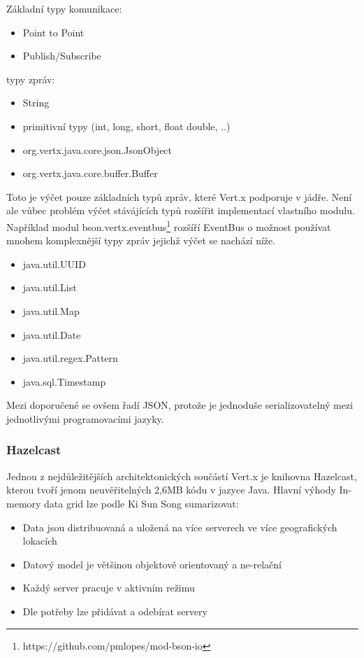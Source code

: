 Základní typy komunikace:
\begin{itemize}
\item{Point to Point}
\item{Publish/Subscribe}
\end{itemize}

typy zpráv:
\begin{itemize}
\item{String}
\item{primitivní typy (int, long, short, float double, ..)}
\item{org.vertx.java.core.json.JsonObject}
\item{org.vertx.java.core.buffer.Buffer}
\end{itemize}

Toto je výčet pouze základních typů zpráv, které Vert.x podporuje v jádře. Není ale vůbec problém výčet stávájících typů rozšířit implementací vlastního modulu. Například modul bson.vertx.eventbus\footnote{https://github.com/pmlopes/mod-bson-io} rozšíří EventBus o možnost používat mnohem komplexnější typy zpráv jejichž výčet se nachází níže.

\begin{itemize}
\item{java.util.UUID}
\item{java.util.List}
\item{java.util.Map}
\item{java.util.Date}
\item{java.util.regex.Pattern}
\item{java.sql.Timestamp}
\end{itemize}

Mezi doporučené se ovšem řadí JSON, protože je jednoduše serializovatelný mezi jednotlivými programovacími jazyky.

\subsubsection{Hazelcast}

Jednou z nejdůležitějších architektonických součástí Vert.x je knihovna Hazelcast, kterou tvoří jenom neuvěřitelných 2,6MB kódu v jazyce Java. Hlavní výhody In-memory data grid\cite{inMemoryDataGrid} lze podle Ki Sun Song sumarizovat:
\begin{itemize}
\item{Data jsou distribuovaná a uložená na více serverech ve více geografických lokacích}
\item{Datový model je většinou objektově orientovaný a ne-relační}
\item{Každý server pracuje v aktivním režimu}
\item{Dle potřeby lze přidávat a odebírat servery}
\end{itemize}


